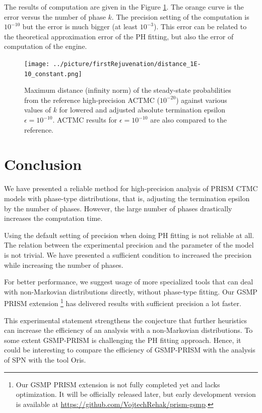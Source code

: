 \documentclass[runningheads,custombib]{llncs}
\begin{document}
	The results of computation are given in the Figure \ref{fig:fr_1E-10_constant}. The orange curve is the error versus the number of phase $k$. The precision setting of the computation is $10^{-10}$ but the error is much bigger (at least $10^{-3}$). This error can be related to the theoretical approximation error of the PH fitting, but also the error of computation of the engine.
	\begin{figure}[H]
		\begin{center}
			\texttt{[image: ../picture/firstRejuvenation/distance\_1E-10\_constant.png]}
		\end{center}
		\caption{Maximum distance (infinity norm) of the steady-state probabilities from the reference high-precision ACTMC ($10^{-20}$) against various values of $k$ for lowered and adjusted absolute termination epsilon $\epsilon = 10^{-10}$. ACTMC results for $\epsilon = 10^{-10}$ are also compared to the reference.}
		\label{fig:fr_1E-10_constant}
	\end{figure}
	
	\section{Conclusion}
	
	
	
	We have presented a reliable method for high-precision analysis of PRISM CTMC models with phase-type distributions, that is, adjusting the termination epsilon by the number of phases. However, the large number of phases drastically increases the computation time.
	
	Using the default setting of precision when doing PH fitting is not reliable at all. The relation between the experimental precision and the parameter of the model is not trivial. We have presented a sufficient condition to increased the precision while increasing the number of phases. 
	
	For better performance, we suggest usage of more specialized tools that can deal with non-Markovian distributions directly, without phase-type fitting. Our GSMP PRISM extension \footnote{Our GSMP PRISM extension is not fully completed yet and lacks optimization. It will be officially released later, but early development version is available at \href{https://github.com/VojtechRehak/prism-gsmp}{https://github.com/VojtechRehak/prism-gsmp}.} has delivered results with sufficient precision a lot faster.
	
	This experimental statement strengthens the conjecture that further heuristics can increase the efficiency of an analysis with a non-Markovian distributions\cite{DBLP:journals/corr/KorenciakKR14}. To some extent GSMP-PRISM is challenging the PH fitting approach. Hence, it could be interesting to compare the efficiency of GSMP-PRISM with the analysis of SPN with the tool Oris.
	
\end{document}
